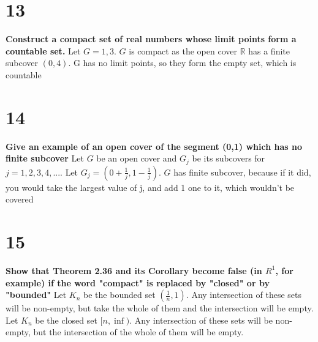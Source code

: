 \documentclass{article}
\begin{document}
\section*{13}
\noindent \textbf{Construct a compact set of real numbers whose limit points form a countable set.}
Let $G = {1,3}$. $G$ is compact as the open cover $\mathbb{R}$ has a finite subcover $(0,4)$. G has no limit points, so they form the empty set, which is countable
\section*{14}
\noindent \textbf{Give an example of an open cover of the segment (0,1) which has no finite subcover}
Let $G$ be an open cover and $G_j$ be its subcovers for $j = 1,2,3,4,...$. Let $G_j = (0 + \frac{1}{j}, 1 - \frac{1}{j})$. $G$ has finite subcover, because if it did, you would take the largest value of j, and add 1 one to it, which wouldn't be covered 
\section*{15}
\noindent \textbf{Show that Theorem 2.36 and its Corollary become false (in $R^1$, for example) if the word "compact" is replaced by "closed" or by "bounded"}
Let $K_n$ be the bounded set $(\frac{1}{n}, 1)$. Any intersection of these sets will be non-empty, but take the whole of them and the intersection will be empty.\\
Let $K_n$ be the closed set $[n, \inf)$. Any intersection of these sets will be non-empty, but the intersection of the whole of them will be empty.
\end{document}
